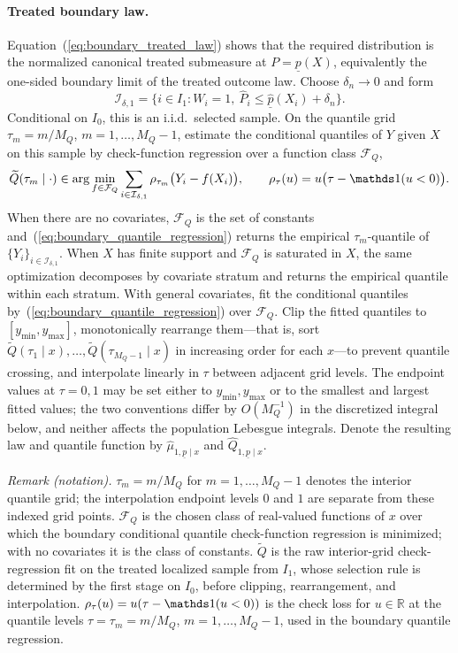 \paragraph{Treated boundary law.} Equation~(\ref{eq:boundary_treated_law}) shows that the required distribution is the normalized canonical treated submeasure at $P=\underline{p}(X)$, equivalently the one-sided boundary limit of the treated outcome law. Choose $\delta_n\to0$ and form
    \begin{equation*}
        \mathcal I_{\delta,1}
        =\{i\in I_1:W_i=1,\ \hat P_i\le \hat{\underline p}(X_i)+\delta_n\}.
    \end{equation*}
Conditional on $I_0$, this is an i.i.d.\ selected sample. On the quantile grid $\tau_m=m/M_Q$, $m=1,\ldots,M_Q-1$, estimate the conditional quantiles of $Y$ given $X$ on this sample by check-function regression over a function class $\mathcal F_Q$,
    \begin{equation}\label{eq:boundary_quantile_regression}
        \widetilde Q(\tau_m\mid\cdot)
        \in\arg\min_{f\in\mathcal F_Q}\sum_{i\in\mathcal I_{\delta,1}}
        \rho_{\tau_m}\bigl(Y_i-f(X_i)\bigr),
        \qquad
        \rho_\tau(u)=u\bigl(\tau-\indicator(u<0)\bigr).
    \end{equation}
When there are no covariates, $\mathcal F_Q$ is the set of constants and~(\ref{eq:boundary_quantile_regression}) returns the empirical $\tau_m$-quantile of $\{Y_i\}_{i\in\mathcal I_{\delta,1}}$. When $X$ has finite support and $\mathcal F_Q$ is saturated in $X$, the same optimization decomposes by covariate stratum and returns the empirical quantile within each stratum. With general covariates, fit the conditional quantiles by~(\ref{eq:boundary_quantile_regression}) over $\mathcal F_Q$. Clip the fitted quantiles to $[y_{\min},y_{\max}]$, monotonically rearrange them---that is, sort $\widetilde Q(\tau_1\mid x),\ldots,\widetilde Q(\tau_{M_Q-1}\mid x)$ in increasing order for each $x$---to prevent quantile crossing, and interpolate linearly in $\tau$ between adjacent grid levels. The endpoint values at $\tau=0,1$ may be set either to $y_{\min},y_{\max}$ or to the smallest and largest fitted values; the two conventions differ by $O(M_Q^{-1})$ in the discretized integral below, and neither affects the population Lebesgue integrals. Denote the resulting law and quantile function by $\hat\mu_{1,\underline p\mid x}$ and $\widehat Q_{1,\underline p\mid x}$.

\noindent\textit{Remark (notation).} $\tau_m=m/M_Q$ for $m=1,\ldots,M_Q-1$ denotes the interior quantile grid; the interpolation endpoint levels $0$ and $1$ are separate from these indexed grid points. $\mathcal F_Q$ is the chosen class of real-valued functions of $x$ over which the boundary conditional quantile check-function regression is minimized; with no covariates it is the class of constants. $\widetilde Q$ is the raw interior-grid check-regression fit on the treated localized sample from $I_1$, whose selection rule is determined by the first stage on $I_0$, before clipping, rearrangement, and interpolation. $\rho_\tau(u)=u(\tau-\indicator(u<0))$ is the check loss for $u\in\mathbb R$ at the quantile levels $\tau=\tau_m=m/M_Q$, $m=1,\ldots,M_Q-1$, used in the boundary quantile regression.


